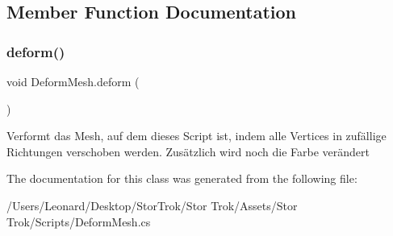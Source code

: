 \subsection{Member Function Documentation}
\mbox{\label{class_deform_mesh_ad2caad01ccc1f4bb7331ca536bff0ead}} 
\subsubsection{\texorpdfstring{deform()}{deform()}}
{\footnotesize\ttfamily void Deform\+Mesh.\+deform (\begin{DoxyParamCaption}{ }\end{DoxyParamCaption})}



Verformt das Mesh, auf dem dieses Script ist, indem alle Vertices in zufällige Richtungen verschoben werden. Zusätzlich wird noch die Farbe verändert 



The documentation for this class was generated from the following file\+:\begin{DoxyCompactItemize}
\item 
/\+Users/\+Leonard/\+Desktop/\+Stor\+Trok/\+Stor Trok/\+Assets/\+Stor Trok/\+Scripts/Deform\+Mesh.\+cs\end{DoxyCompactItemize}
